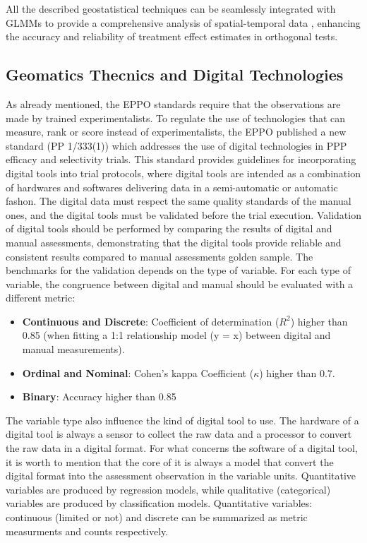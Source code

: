 \documentclass[12pt,a4paper,oneside]{report}
\begin{document}
All the described geostatistical techniques can be seamlessly integrated with GLMMs to
provide a comprehensive analysis of spatial-temporal data
\cite{slaetsLinearMixedModels2021,rodriguez-alvarezCorrectingSpatialHeterogeneity2018}, 
enhancing the accuracy and reliability of treatment effect estimates in orthogonal
tests.

\subsection{Geomatics Thecnics and Digital Technologies}

As already mentioned, the EPPO standards require that the
observations are made by trained experimentalists.
To regulate the use of technologies that can measure, rank or score instead of 
experimentalists, the EPPO published a new standard (PP 1/333(1)\cite{PP1333}) which 
addresses the use of digital technologies in PPP efficacy and selectivity trials.
This standard provides guidelines for incorporating digital
tools into trial protocols, where digital tools are intended as a combination of
hardwares and softwares delivering data 
in a semi-automatic or automatic fashon.
The digital data must respect the same quality standards of the manual
ones, and the digital tools must be validated before the trial execution.
Validation of digital tools should
be performed by comparing the results of digital and manual assessments, 
demonstrating that the digital tools provide reliable and consistent
results compared to manual assessments golden sample. 
The benchmarks for the validation depends
on the type of variable. For each type of variable, the congruence between 
digital and manual should be evaluated with a different metric:

\begin{itemize}
    \item \textbf{Continuous and Discrete}: Coefficient of determination ($R^2$) higher than 0.85 (when fitting a 1:1 relationship model (y = x) between digital and manual measurements).
    \item \textbf{Ordinal and Nominal}: Cohen's kappa Coefficient ($\kappa$) higher than 0.7.
    \item \textbf{Binary}: Accuracy higher than 0.85
\end{itemize}

The variable type also influence the kind of digital tool to use.
The hardware of a digital tool is always a sensor to collect the raw data and a
processor to convert the raw data in a digital format.
For what concerns the software of a digital tool, it is worth to mention that
the core of it is always a model that convert the digital format into the assessment
observation in the variable units.
Quantitative variables are produced by regression models, while qualitative (categorical) 
variables are produced by classification models. 
Quantitative variables: continuous (limited or not) and discrete
can be summarized as metric measurments and counts respectively.
\end{document}

